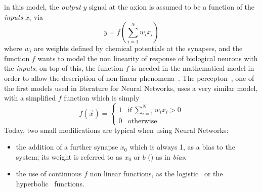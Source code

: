 in this model, the \emph{output} $y$ signal at the axion is assumed to be a function of the \emph{inputs} $x_i$ via
 \begin{equation}
   y = f(\sum_{i=1}^{N} w_i x_i)
   \label{eq:artificialneuron}
 \end{equation}
where $w_i$ are weights defined by chemical potentials at the synapses, and the function $f$ wants to model the non linearity of response of biological neurons with the \emph{inputs}; on top of this, the function $f$ is needed in the mathematical model in order to allow the description of non linear phenomena~\cite{nonlinearitytheorem}. The percepton~\cite{perceptron}, one of the first models used in literature for Neural Networks, uses a very similar model, with a simplified $f$ function which is simply
\begin{equation}
  f(\vec{x})= \begin{cases}
                1 &  \text{if}\  \sum_{i=1}^{N} w_i x_i >0 \\
                0 &  \text{otherwise}
              \end{cases}
\end{equation}
Today, two small modifications are typical when using Neural Networks:
\begin{itemize}
\item the addition of a further synapse $x_0$ which is always 1, as a bias to the system; its weight is referred to as $x_0$ or $b$ () as in \emph{bias}.
\item the use of continuous $f$ non linear functions, as the logistic~\cite{logistic} or the hyperbolic~\cite{hyperbolic} functions.
\end{itemize}

